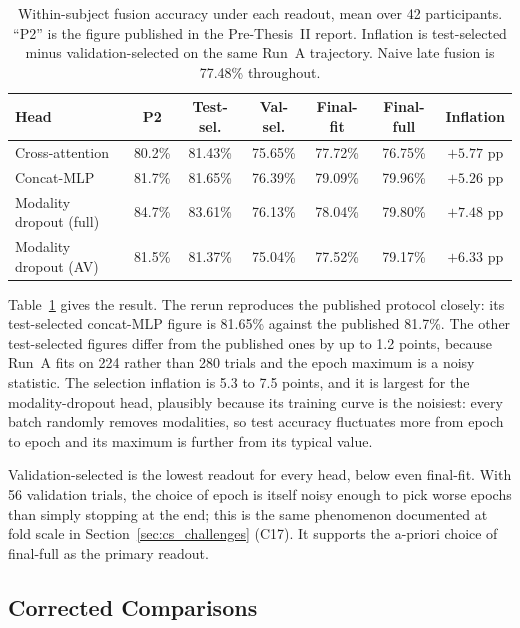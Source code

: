 \begin{table}[htbp]
\centering
\small
\caption{Within-subject fusion accuracy under each readout, mean over 42
participants. ``P2'' is the figure published in the Pre-Thesis~II report. Inflation is
test-selected minus validation-selected on the same Run~A trajectory. Naive late
fusion is 77.48\% throughout.}
\label{tab:audit_leakfree}
\begin{tabular}{lcccccc}
\hline
\textbf{Head} & \textbf{P2} & \textbf{Test-sel.} & \textbf{Val-sel.} & \textbf{Final-fit} & \textbf{Final-full} & \textbf{Inflation} \\
\hline
Cross-attention         & 80.2\% & 81.43\% & 75.65\% & 77.72\% & 76.75\% & $+5.77$ pp \\
Concat-MLP              & 81.7\% & 81.65\% & 76.39\% & 79.09\% & 79.96\% & $+5.26$ pp \\
Modality dropout (full) & 84.7\% & 83.61\% & 76.13\% & 78.04\% & 79.80\% & $+7.48$ pp \\
Modality dropout (AV)   & 81.5\% & 81.37\% & 75.04\% & 77.52\% & 79.17\% & $+6.33$ pp \\
\hline
\end{tabular}
\end{table}

Table~\ref{tab:audit_leakfree} gives the result. The rerun reproduces the published
protocol closely: its test-selected concat-MLP figure is 81.65\% against the published
81.7\%. The other test-selected figures differ from the published ones by up to 1.2
points, because Run~A fits on 224 rather than 280 trials and the epoch maximum is a
noisy statistic. The selection inflation is 5.3 to 7.5 points, and it is largest for the
modality-dropout head, plausibly because its training curve is the noisiest: every
batch randomly removes modalities, so test accuracy fluctuates more from epoch to epoch
and its maximum is further from its typical value.

Validation-selected is the lowest readout for every head, below even final-fit. With
56 validation trials, the choice of epoch is itself noisy enough to pick worse epochs
than simply stopping at the end; this is the same phenomenon documented at fold scale
in Section~\ref{sec:cs_challenges} (C17). It supports the a-priori choice of final-full
as the primary readout.

\subsection{Corrected Comparisons}

